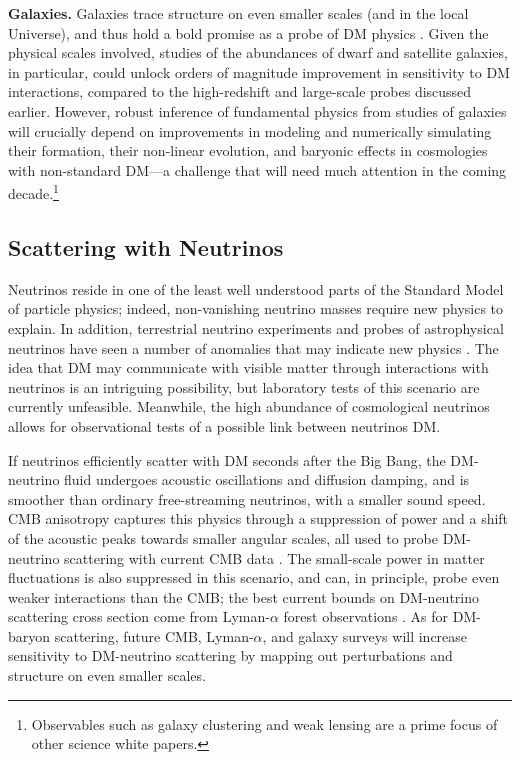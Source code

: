 \documentclass[12pt]{article}
\begin{document}
\textbf{Galaxies.}
Galaxies trace structure on even smaller scales (and in the local Universe), and thus hold a bold promise as a probe of DM physics \cite{2019arXiv190201055D}.
Given the physical scales involved, studies of the abundances of dwarf and satellite galaxies, in particular, could unlock orders of magnitude improvement in sensitivity to DM interactions, compared to the high-redshift and large-scale probes discussed earlier.
However, robust inference of fundamental physics from studies of galaxies will crucially depend on improvements in modeling and numerically simulating their formation, their non-linear evolution, and baryonic effects in cosmologies with non-standard DM---a challenge that will need much attention in the coming decade.\footnote{Observables such as galaxy clustering and weak lensing are a prime focus of other science white papers.}

\subsection{Scattering with Neutrinos}

Neutrinos reside in one of the least well understood parts of the Standard Model of particle physics; indeed, non-vanishing neutrino masses require new physics to explain. 
In addition, terrestrial neutrino experiments and probes of astrophysical neutrinos have seen a number of anomalies that may indicate new physics \cite{Athanassopoulos:1996jb, Aguilar:2001ty,AguilarArevalo:2007it,2018arXiv180512028M,Gorham:2016zah,Gorham:2018ydl}.
The idea that DM may communicate with visible matter through interactions with neutrinos is an intriguing possibility, but laboratory tests of this scenario are currently unfeasible.
Meanwhile, the high abundance of cosmological neutrinos allows for observational tests of a possible link between neutrinos DM.

If neutrinos efficiently scatter with DM seconds after the Big Bang, the DM-neutrino fluid undergoes acoustic oscillations and diffusion damping, and is smoother than ordinary free-streaming neutrinos, with a smaller sound speed.
CMB anisotropy captures this physics through a suppression of power and a shift of the acoustic peaks towards smaller angular scales, all used to probe DM-neutrino scattering with current CMB data \cite{Mangano:2006mp,Escudero:2015yka,DiValentino:2017oaw,Diacoumis:2018ezi}.
The small-scale power in matter fluctuations is also suppressed in this scenario, and can, in principle, probe even weaker interactions than the CMB; the best current bounds on DM-neutrino scattering cross section come from Lyman-$\alpha$ forest observations \cite{Wilkinson:2014ksa}.
As for DM-baryon scattering, future CMB, Lyman-$\alpha$, and galaxy surveys will increase sensitivity to DM-neutrino scattering by mapping out perturbations and structure on even smaller scales.
\end{document}

